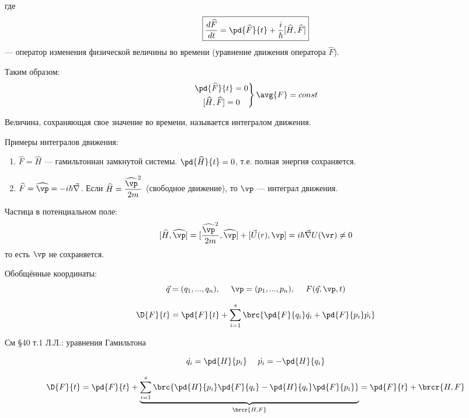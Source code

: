 где
\begin{equation}
\label{eq:5_2_6}
\boxed{\frac{d\widehat{F}}{dt} = \pd{\widehat{F}}{t} + \frac{i}{\hbar} [\widehat{H}, \widehat{F}]}
\end{equation}
--- оператор изменения физической величины во времени (уравнение движения оператора $\widehat{F}$).

Таким образом:
$$
\left.
\begin{gathered}
\pd{\widehat{F}}{t}=0 \\
[\widehat{H}, \widehat{F}]=0
\end{gathered}
\right\} \avg{F}=const
$$

\begin{defn}
Величина, сохраняющая свое значение во времени, называется интегралом движения.
\end{defn}

Примеры интегралов движения:
\begin{enumerate}
\item $\widehat{F} = \widehat{H}$ --- гамильтониан замкнутой системы. $\pd{\widehat{H}}{t}=0$, т.е. полная энергия сохраняется.
\item $\widehat{F} = \widehat{\vp} = - i \hbar \vec{\nabla}$.  Если $\displaystyle\widehat{H} = \frac{\widehat{\vp}^2}{2m}$ (свободное движение), то $\vp$ --- интеграл движения.
\end{enumerate}

Частица в потенциальном поле:
\begin{equation}
\label{eq:5_2_7}
[\widehat{H}, \widehat{\vp}] = [\frac{\widehat{\vp}^2}{2m}, \widehat{\vp}] + [\vec{U}(r), \vp] = i \hbar \vec{\nabla} U(\vr) \ne 0
\end{equation}
то есть $\vp$ не сохраняется.

Обобщённые координаты:
$$
\vec{q} = (q_1, ..., q_n),~~~~ \vp = (p_1, ..., p_n), ~~~~ F(\vec{q}, \vp, t)
$$

$$
\D{F}{t} = \pd{F}{t} + \sum_{i=1}^{s}\brc{\pd{F}{q_i} \dot{q_i} + \pd{F}{p_i} \dot{p_i} }
$$

См \S 40 т.1 Л.Л.: уравнения Гамильтона

$$
\dot{q_i} = \pd{H}{p_i} ~~~~ \dot{p_i} = -\pd{H}{q_i}
$$

\begin{equation}
\label{eq:5_2_8}
\D{F}{t}= \pd{F}{t} + \underbrace{ \sum_{i=1}^{s} \brc{ \pd{H}{p_i} \pd{F}{q_i} - \pd{H}{q_i} \pd{F}{p_i} } }_{\brcr{H, F}} = \pd{F}{t} + \brcr{H, F}
\end{equation}

